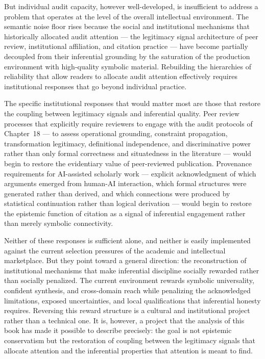 \documentclass[12pt, openright, twoside]{book}
\begin{document}
But individual audit capacity, however well-developed, is insufficient
to address a problem that operates at the level of the overall intellectual
environment. The semantic noise floor rises because the social and
institutional mechanisms that historically allocated audit attention ---
the legitimacy signal architecture of peer review, institutional affiliation,
and citation practice --- have become partially decoupled from their
inferential grounding by the saturation of the production environment with
high-quality symbolic material. Rebuilding the hierarchies of reliability
that allow readers to allocate audit attention effectively requires
institutional responses that go beyond individual practice.

The specific institutional responses that would matter most are those
that restore the coupling between legitimacy signals and inferential
quality. Peer review processes that explicitly require reviewers to engage
with the audit protocols of Chapter~18 --- to assess operational grounding,
constraint propagation, transformation legitimacy, definitional independence,
and discriminative power rather than only formal correctness and
situatedness in the literature --- would begin to restore the evidentiary
value of peer-reviewed publication. Provenance requirements for AI-assisted
scholarly work --- explicit acknowledgment of which arguments emerged from
human-AI interaction, which formal structures were generated rather than
derived, and which connections were produced by statistical continuation
rather than logical derivation --- would begin to restore the epistemic
function of citation as a signal of inferential engagement rather than
merely symbolic connectivity.

Neither of these responses is sufficient alone, and neither is easily
implemented against the current selection pressures of the academic and
intellectual marketplace. But they point toward a general direction:
the reconstruction of institutional mechanisms that make inferential
discipline socially rewarded rather than socially penalized. The current
environment rewards symbolic universality, confident synthesis, and
cross-domain reach while penalizing the acknowledged limitations,
exposed uncertainties, and local qualifications that inferential honesty
requires. Reversing this reward structure is a cultural and institutional
project rather than a technical one. It is, however, a project that
the analysis of this book has made it possible to describe precisely:
the goal is not epistemic conservatism but the restoration of coupling
between the legitimacy signals that allocate attention and the inferential
properties that attention is meant to find.
\end{document}
